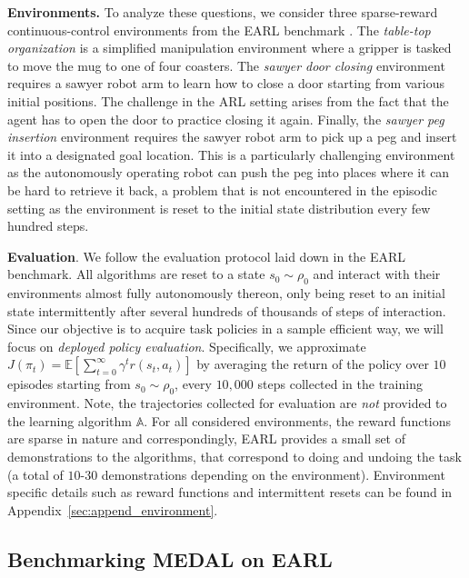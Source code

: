 \documentclass[nohyperref]{article}
\theoremstyle{plain}
\theoremstyle{definition}
\theoremstyle{remark}
\begin{document}
\textbf{Environments.} To analyze these questions, we consider three sparse-reward continuous-control environments from the EARL benchmark \citep{sharma2021autonomous}.
The \emph{table-top organization} is a simplified manipulation environment where a gripper is tasked to move the mug to one of four coasters.
The \emph{sawyer door closing} environment requires a sawyer robot arm to learn how to close a door starting from various initial positions. The challenge in the ARL setting arises from the fact that the agent has to open the door to practice closing it again. Finally, the \emph{sawyer peg insertion} environment requires the sawyer robot arm to pick up a peg and insert it into a designated goal location. This is a particularly challenging environment as the autonomously operating robot can push the peg into places where it can be hard to retrieve it back, a problem that is not encountered in the episodic setting as the environment is reset to the initial state distribution every few hundred steps.

\textbf{Evaluation}. We follow the evaluation protocol laid down in the EARL benchmark. All algorithms are reset to a state $s_0 \sim \rho_0$ and interact with their environments almost fully autonomously thereon, only being reset to an initial state intermittently after several hundreds of thousands of steps of interaction. Since our objective is to acquire task policies in a sample efficient way, we will focus on \textit{deployed policy evaluation}. Specifically, we approximate $J(\pi_t) = \mathbb{E}[\sum_{t=0}^\infty \gamma^t r(s_t, a_t)]$ by averaging the return of the policy over $10$ episodes starting from $s_0 \sim \rho_0$, every $10,000$ steps collected in the training environment. Note, the trajectories collected for evaluation are \textit{not} provided to the learning algorithm $\mathbb{A}$. For all considered environments, the reward functions are sparse in nature and correspondingly, EARL provides a small set of demonstrations to the algorithms, that correspond to doing and undoing the task (a total of $10$-$30$ demonstrations depending on the environment). Environment specific details such as reward functions and intermittent resets can be found in Appendix~\ref{sec:append_environment}.

\subsection{Benchmarking MEDAL on EARL}
\label{sec:benchmark}
\end{document}
